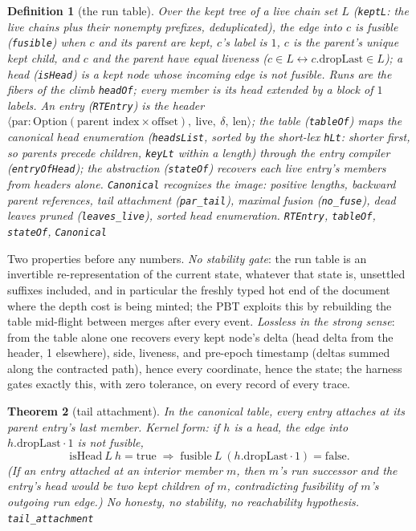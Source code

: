 \documentclass[11pt]{article}
\newtheorem{theorem}{Theorem}[section]
\newtheorem{definition}[theorem]{Definition}
\newcommand{\lean}[1]{\texttt{#1}}
\newcommand{\code}[1]{\texttt{#1}}
\begin{document}
\begin{definition}[the run table]
\label{def:runtable}
Over the kept tree of a live chain set $L$ (\lean{keptL}: the live
chains plus their nonempty prefixes, deduplicated), the edge into $c$
is \emph{fusible} (\lean{fusible}) when $c$ and its parent are kept,
$c$'s label is $1$, $c$ is the parent's \emph{unique} kept child, and
$c$ and the parent have equal liveness ($c \in L \leftrightarrow
c.\mathrm{dropLast} \in L$); a \emph{head} (\lean{isHead}) is a kept
node whose incoming edge is not fusible. Runs are the fibers of the
climb \lean{headOf}; every member is its head extended by a block of
$1$ labels. An entry (\lean{RTEntry}) is the header
$\langle \mathrm{par} : \mathrm{Option}(\text{parent index} \times
\text{offset}),\ \mathrm{live},\ \delta,\ \mathrm{len} \rangle$; the
table (\lean{tableOf}) maps the canonical head enumeration
(\lean{headsList}, sorted by the short-lex \lean{hLt}: shorter first,
so parents precede children, \lean{keyLt} within a length) through the
entry compiler (\lean{entryOfHead}); the abstraction (\lean{stateOf})
recovers each live entry's members from headers alone.
\lean{Canonical} recognizes the image: positive lengths, backward
parent references, tail attachment (\code{par\_tail}), maximal fusion
(\code{no\_fuse}), dead leaves pruned (\code{leaves\_live}), sorted
head enumeration.
\hfill\lean{RTEntry}, \lean{tableOf}, \lean{stateOf}, \lean{Canonical}
\end{definition}

Two properties before any numbers. \emph{No stability gate}: the run
table is an invertible re-representation of the current state, whatever
that state is, unsettled suffixes included, and in particular the
freshly typed hot end of the document where the depth cost is being
minted; the PBT exploits this by rebuilding the table mid-flight
between merges after every event. \emph{Lossless in the strong sense}:
from the table alone one recovers every kept node's delta (head delta
from the header, 1 elsewhere), side, liveness, and pre-epoch timestamp
(deltas summed along the contracted path), hence every coordinate,
hence the state; the harness gates exactly this, with zero tolerance,
on every record of every trace.

\begin{theorem}[tail attachment]
\label{thm:tailattach}
In the canonical table, every entry attaches at its parent entry's
last member. Kernel form: if $h$ is a head, the edge into
$h.\mathrm{dropLast} \cdot 1$ is not fusible,
\[
  \mathrm{isHead}\ L\ h = \mathrm{true} \;\Longrightarrow\;
  \mathrm{fusible}\ L\ (h.\mathrm{dropLast} \cdot 1) =
  \mathrm{false}.
\]
(If an entry attached at an interior member $m$, then $m$'s run
successor and the entry's head would be two kept children of $m$,
contradicting fusibility of $m$'s outgoing run edge.) No honesty, no
stability, no reachability hypothesis.
\hfill\lean{tail\_attachment}
\end{theorem}
\end{document}
